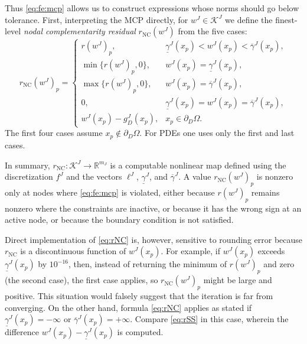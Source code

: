 \documentclass[letterpaper,final,12pt,reqno]{amsart}
\theoremstyle{cstyle}
\theoremstyle{cstyle*}
\theoremstyle{dstyle}
\numberwithin{equation}{section}
\numberwithin{figure}{section}
\numberwithin{table}{section}
\numberwithin{theorem}{section}
\newcommand{\RR}{\mathbb{R}}
\newcommand{\rNC}{r_{\text{NC}}}
\begin{document}
Thus \eqref{eq:fe:mcp} allows us to construct expressions whose norms should go below tolerance.  First, interpreting the MCP directly, for $w^J \in \mathcal{K}^J$ we define the finest-level \emph{nodal complementarity residual} $\rNC(w^J)$ from the five cases:
\begin{equation}
\rNC(w^J)_p = \begin{cases}
    r(w^J)_p, & \underline{\gamma}^J(x_p) < w^J(x_p) < \overline{\gamma}^J(x_p), \\
    \min\{r(w^J)_p,0\}, & w^J(x_p) = \underline{\gamma}^J(x_p), \\
    \max\{r(w^J)_p,0\}, & w^J(x_p) = \overline{\gamma}^J(x_p), \\
    0, & \underline{\gamma}^J(x_p)=w^J(x_p)=\overline{\gamma}^J(x_p), \\
    w^J(x_p) - g_D^J(x_p), & x_p \in \partial_D\Omega. \end{cases} \label{eq:rNC}
\end{equation}
The first four cases assume $x_p \notin \partial_D\Omega$.  For PDEs one uses only the first and last cases.

In summary, $\rNC : \mathcal{K}^J \to \RR^{m_J}$ is a computable nonlinear map defined using the discretization $f^J$ and the vectors $\ell^J$, $\underline{\gamma}^J$, and $\overline{\gamma}^J$.  A value $\rNC(w^J)_p$ is nonzero only at nodes where \eqref{eq:fe:mcp} is violated, either because $r(w^J)_p$ remains nonzero where the constraints are inactive, or because it has the wrong sign at an active node, or because the boundary condition is not satisfied.

Direct implementation of \eqref{eq:rNC} is, however, sensitive to rounding error because $\rNC$ is a discontinuous function of $w^J(x_p)$.  For example, if $w^J(x_p)$ exceeds $\underline{\gamma}^J(x_p)$ by $10^{-16}$, then, instead of returning the minimum of $r(w^J)_p$ and zero (the second case), the first case applies, so $\rNC(w^J)_p$ might be large and positive.  This situation would falsely suggest that the iteration is far from converging.  On the other hand, formula \eqref{eq:rNC} applies as stated if $\underline{\gamma}^J(x_p)=-\infty$ or $\overline{\gamma}^J(x_p)=+\infty$.  Compare \eqref{eq:rSS} in this case, wherein the difference $w^J(x_p) - \underline{\gamma}^J(x_p)$ is computed.
\end{document}
